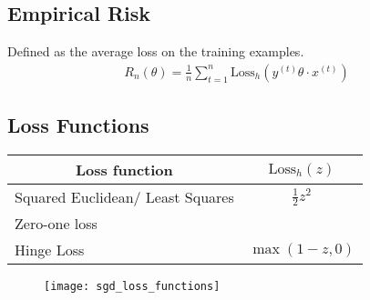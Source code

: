 \documentclass[a4paper]{article}
\begin{document}
\subsection{Empirical Risk}
Defined as the average loss on the training examples.
\begin{align*}
	R_n(\theta) = \frac{1}{n} \sum_{t=1}^{n} \text{Loss}_h(y^{(t)}\theta\cdot x^{(t)})
\end{align*}
\subsection{Loss Functions}
\begin{table}[H]
	\centering
	\begin{tabular}{|l|c|}
		\hline
		\multicolumn{1}{|c|}{\textbf{Loss function}} & \textbf{$\text{Loss}_h(z)$} \\ \hline
		Squared Euclidean/ Least Squares             & $\frac{1}{2}z^2$            \\ \hline
		Zero-one loss                                &                             \\ \hline
		Hinge Loss                                   & $\max{(1-z , 0)}$           \\ \hline
	\end{tabular}
\end{table}
\begin{figure}[H]
	\centering
	\texttt{[image: sgd\_loss\_functions]}
	\label{fig:sgdlossfunctions}
\end{figure}
\end{document}
